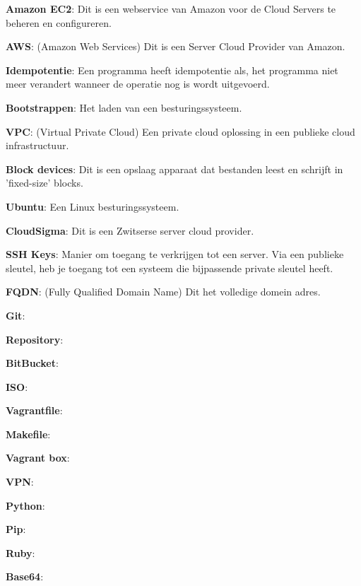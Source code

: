 \textbf{Amazon EC2}: Dit is een webservice van Amazon voor de Cloud Servers te beheren en configureren.

\textbf{AWS}: (Amazon Web Services) Dit is een Server Cloud Provider van Amazon.

\textbf{Idempotentie}: Een programma heeft idempotentie als, het programma niet meer verandert wanneer de operatie nog is wordt uitgevoerd.

\textbf{Bootstrappen}: Het laden van een besturingssysteem.

\textbf{VPC}: (Virtual Private Cloud) Een private cloud oplossing in een publieke cloud infrastructuur.

\textbf{Block devices}: Dit is een opslaag apparaat dat bestanden leest en schrijft in 'fixed-size' blocks.	

\textbf{Ubuntu}: Een Linux besturingssysteem.

\textbf{CloudSigma}: Dit is een Zwitserse server cloud provider.

\textbf{SSH Keys}: Manier om toegang te verkrijgen tot een server. Via een publieke sleutel, heb je toegang tot een systeem die bijpassende private sleutel heeft.

\textbf{FQDN}: (Fully Qualified Domain Name) Dit het volledige domein adres.

\textbf{Git}:

\textbf{Repository}:

\textbf{BitBucket}:

\textbf{ISO}:

\textbf{Vagrantfile}:

\textbf{Makefile}:

\textbf{Vagrant box}:

\textbf{VPN}:

\textbf{Python}:

\textbf{Pip}:

\textbf{Ruby}:

\textbf{Base64}: